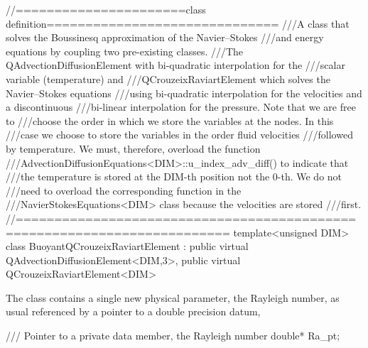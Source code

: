  
\begin{DoxyCodeInclude}
\textcolor{comment}{//======================class definition==============================}
\textcolor{comment}{///A class that solves the Boussinesq approximation of the Navier--Stokes}
\textcolor{comment}{}\textcolor{comment}{///and energy equations by coupling two pre-existing classes. }
\textcolor{comment}{}\textcolor{comment}{///The QAdvectionDiffusionElement with bi-quadratic interpolation for the}
\textcolor{comment}{}\textcolor{comment}{///scalar variable (temperature) and}
\textcolor{comment}{}\textcolor{comment}{///QCrouzeixRaviartElement which solves the Navier--Stokes equations}
\textcolor{comment}{}\textcolor{comment}{///using bi-quadratic interpolation for the velocities and a discontinuous}
\textcolor{comment}{}\textcolor{comment}{///bi-linear interpolation for the pressure. Note that we are free to }
\textcolor{comment}{}\textcolor{comment}{///choose the order in which we store the variables at the nodes. In this}
\textcolor{comment}{}\textcolor{comment}{///case we choose to store the variables in the order fluid velocities}
\textcolor{comment}{}\textcolor{comment}{///followed by temperature. We must, therefore, overload the function}
\textcolor{comment}{}\textcolor{comment}{///AdvectionDiffusionEquations<DIM>::u\_index\_adv\_diff() to indicate that}
\textcolor{comment}{}\textcolor{comment}{///the temperature is stored at the DIM-th position not the 0-th. We do not}
\textcolor{comment}{}\textcolor{comment}{///need to overload the corresponding function in the }
\textcolor{comment}{}\textcolor{comment}{///NavierStokesEquations<DIM> class because the velocities are stored}
\textcolor{comment}{}\textcolor{comment}{///first.}
\textcolor{comment}{}\textcolor{comment}{//=========================================================================}
\textcolor{keyword}{template}<\textcolor{keywordtype}{unsigned} DIM>
\textcolor{keyword}{class }BuoyantQCrouzeixRaviartElement :
 \textcolor{keyword}{public} \textcolor{keyword}{virtual} QAdvectionDiffusionElement<DIM,3>,
 \textcolor{keyword}{public} \textcolor{keyword}{virtual} QCrouzeixRaviartElement<DIM>

\end{DoxyCodeInclude}


The class contains a single new physical parameter, the Rayleigh number, as usual referenced by a pointer to a double precision datum,

 
\begin{DoxyCodeInclude}
 \textcolor{comment}{/// Pointer to a private data member, the Rayleigh number}
 \textcolor{keywordtype}{double}* Ra\_pt;

\end{DoxyCodeInclude}



